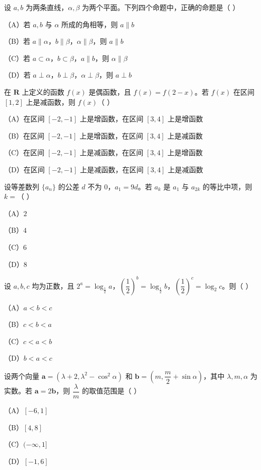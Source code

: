 \begin{question}
设 $a,b$ 为两条直线，$\alpha,\beta$ 为两个平面。下列四个命题中，正确的命题是（ ）

（A）若 $a,b$ 与 $\alpha$ 所成的角相等，则 $a\parallel b$

（B）若 $a\parallel\alpha$，$b\parallel\beta$，$\alpha\parallel\beta$，则 $a\parallel b$

（C）若 $a\subset\alpha$，$b\subset\beta$，$a\parallel b$，则 $\alpha\parallel\beta$

（D）若 $a\perp\alpha$，$b\perp\beta$，$\alpha\perp\beta$，则 $a\perp b$

\end{question}
\begin{question}
在 $\mathbf{R}$ 上定义的函数 $f(x)$ 是偶函数，且 $f(x)=f(2-x)$。若 $f(x)$ 在区间 $[1,2]$ 上是减函数，则 $f(x)$（ ）

（A）在区间 $[-2,-1]$ 上是增函数，在区间 $[3,4]$ 上是增函数

（B）在区间 $[-2,-1]$ 上是增函数，在区间 $[3,4]$ 上是减函数

（C）在区间 $[-2,-1]$ 上是减函数，在区间 $[3,4]$ 上是增函数

（D）在区间 $[-2,-1]$ 上是减函数，在区间 $[3,4]$ 上是减函数

\end{question}
\begin{question}
设等差数列 $\{a_n\}$ 的公差 $d$ 不为 $0$，$a_1=9d$。若 $a_k$ 是 $a_1$ 与 $a_{2k}$ 的等比中项，则 $k=$（ ）

（A）$2$

（B）$4$

（C）$6$

（D）$8$

\end{question}
\begin{question}
设 $a,b,c$ 均为正数，且 $2^a=\log_{\frac12}a$，$\left(\dfrac{1}{2}\right)^b=\log_{\frac12}b$，$\left(\dfrac{1}{2}\right)^c=\log_2 c$。则（ ）

（A）$a<b<c$

（B）$c<b<a$

（C）$c<a<b$

（D）$b<a<c$

\end{question}
\begin{question}
设两个向量 $\boldsymbol{a}=(\lambda+2,\lambda^2-\cos^2\alpha)$ 和 $\boldsymbol{b}=\left(m,\dfrac{m}{2}+\sin\alpha\right)$，其中 $\lambda,m,\alpha$ 为实数。若 $\boldsymbol{a}=2\boldsymbol{b}$，则 $\dfrac{\lambda}{m}$ 的取值范围是（ ）

（A）$[-6,1]$

（B）$[4,8]$

（C）$(-\infty,1]$

（D）$[-1,6]$

\end{question}

